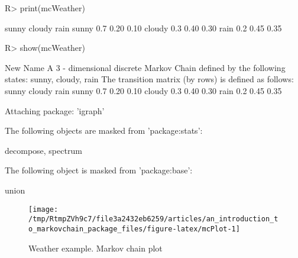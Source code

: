 \documentclass[
  nojss]{jss}
\begin{document}
\begin{CodeChunk}

\begin{CodeInput}
R> print(mcWeather)
\end{CodeInput}

\begin{CodeOutput}
       sunny cloudy rain
sunny    0.7   0.20 0.10
cloudy   0.3   0.40 0.30
rain     0.2   0.45 0.35
\end{CodeOutput}

\begin{CodeInput}
R> show(mcWeather)
\end{CodeInput}

\begin{CodeOutput}
New Name 
 A  3 - dimensional discrete Markov Chain defined by the following states: 
 sunny, cloudy, rain 
 The transition matrix  (by rows)  is defined as follows: 
       sunny cloudy rain
sunny    0.7   0.20 0.10
cloudy   0.3   0.40 0.30
rain     0.2   0.45 0.35
\end{CodeOutput}
\end{CodeChunk}

\begin{CodeChunk}

\begin{CodeOutput}

Attaching package: 'igraph'
\end{CodeOutput}

\begin{CodeOutput}
The following objects are masked from 'package:stats':

    decompose, spectrum
\end{CodeOutput}

\begin{CodeOutput}
The following object is masked from 'package:base':

    union
\end{CodeOutput}
\begin{figure}

{\centering \texttt{[image: /tmp/RtmpZVh9c7/file3a2432eb6259/articles/an\_introduction\_to\_markovchain\_package\_files/figure-latex/mcPlot-1]} 

}

\caption[Weather example]{Weather example. Markov chain plot}\label{fig:mcPlot}
\end{figure}
\end{CodeChunk}
\end{document}
